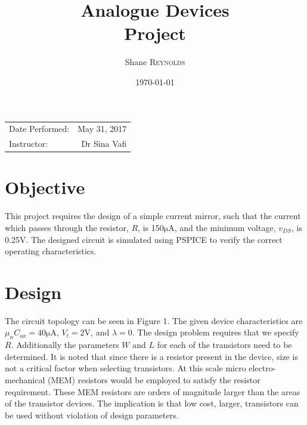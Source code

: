 \documentclass{article}
\title{Analogue Devices \\ Project} %
\author{Shane \textsc{Reynolds}} %
\date{\today} %
\begin{document}
\maketitle %

\begin{center}
\begin{tabular}{l r}
Date Performed: & May 31, 2017 \\ %
Instructor: & Dr Sina Vafi %
\end{tabular}
\end{center}



\section{Objective}
This project requires the design of a simple current mirror, such that the current which passes through the resistor, $R$, is 150$\si{\micro\ampere}$, and the minimum voltage, $v_{DS}$, is 0.25$\si{\volt}$. The designed circuit is simulated using PSPICE to verify the correct operating characteristics.



\section{Design}
The circuit topology can be seen in Figure 1. The given device characteristics are $\mu_n C_{ox} = 40 \si{\micro\ampere}$, $V_t = 2 \si{\volt}$, and $\lambda = 0$. The design problem requires that we specify $R$. Additionally the parameters $W$ and $L$ for each of the transistors need to be determined. It is noted that since there is a resistor present in the device, size is not a critical factor when selecting transistors. At this scale micro electro-mechanical (MEM) resistors would be employed to satisfy the resistor requirement. These MEM resistors are orders of magnitude larger than the areas of the transistor devices. The implication is that low cost, larger, transistors can be used without violation of design parameters.\\
\end{document}
